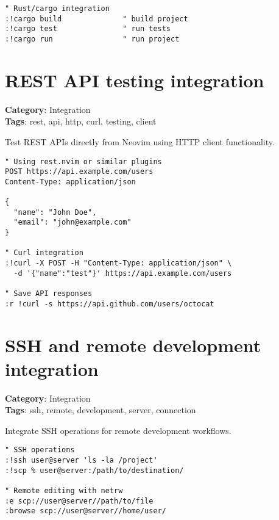 {{{{{{\begin{Exa*}{}
\begin{Verbatim}[fontsize=\footnotesize, breaklines, breakanywhere]
" Rust/cargo integration
:!cargo build              " build project
:!cargo test               " run tests
:!cargo run                " run project
\end{Verbatim}
\end{Exa*}

\section{REST API testing integration}

\textbf{Category}: Integration\\ \textbf{Tags}: rest, api, http, curl, testing, client
\vspace{0.5cm}

Test REST APIs directly from Neovim using HTTP client functionality.

\begin{Exa*}{}
\begin{Verbatim}[fontsize=\footnotesize, breaklines, breakanywhere]
" Using rest.nvim or similar plugins
POST https://api.example.com/users
Content-Type: application/json

{
  "name": "John Doe",
  "email": "john@example.com"
}

" Curl integration
:!curl -X POST -H "Content-Type: application/json" \
  -d '{"name":"test"}' https://api.example.com/users

" Save API responses
:r !curl -s https://api.github.com/users/octocat
\end{Verbatim}
\end{Exa*}

\section{SSH and remote development integration}

\textbf{Category}: Integration\\ \textbf{Tags}: ssh, remote, development, server, connection
\vspace{0.5cm}

Integrate SSH operations for remote development workflows.

\begin{Exa*}{}
\begin{Verbatim}[fontsize=\footnotesize, breaklines, breakanywhere]
" SSH operations
:!ssh user@server 'ls -la /project'
:!scp % user@server:/path/to/destination/

" Remote editing with netrw
:e scp://user@server//path/to/file
:browse scp://user@server//home/user/


\end{Verbatim}
\end{Exa*}}}}}}}
